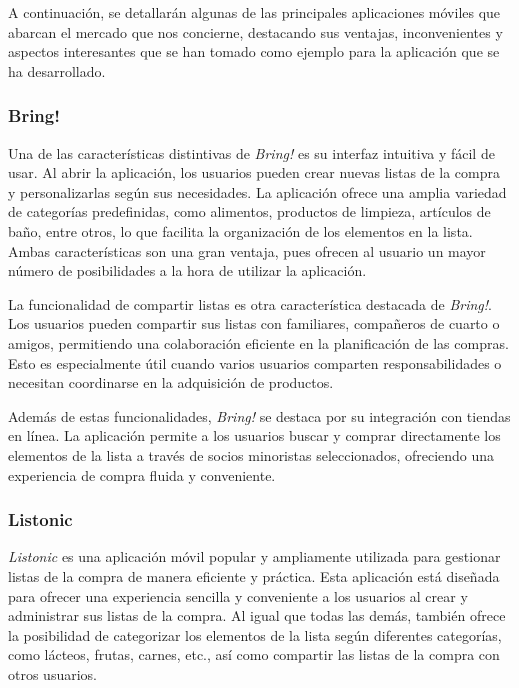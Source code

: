 \documentclass{article}
\begin{document}
A continuación, se detallarán algunas de las principales aplicaciones móviles que abarcan el mercado que nos concierne, destacando sus ventajas, inconvenientes y aspectos interesantes que se han tomado como ejemplo para la aplicación que se ha desarrollado.

\subsubsection{Bring!}

Una de las características distintivas de \textit{Bring!} es su interfaz intuitiva y fácil de usar. Al abrir la aplicación, los usuarios pueden crear nuevas listas de la compra y personalizarlas según sus necesidades. La aplicación ofrece una amplia variedad de categorías predefinidas, como alimentos, productos de limpieza, artículos de baño, entre otros, lo que facilita la organización de los elementos en la lista. Ambas características son una gran ventaja, pues ofrecen al usuario un mayor número de posibilidades a la hora de utilizar la aplicación.

La funcionalidad de compartir listas es otra característica destacada de \textit{Bring!}. Los usuarios pueden compartir sus listas con familiares, compañeros de cuarto o amigos, permitiendo una colaboración eficiente en la planificación de las compras. Esto es especialmente útil cuando varios usuarios comparten responsabilidades o necesitan coordinarse en la adquisición de productos.

Además de estas funcionalidades, \textit{Bring!} se destaca por su integración con tiendas en línea. La aplicación permite a los usuarios buscar y comprar directamente los elementos de la lista a través de socios minoristas seleccionados, ofreciendo una experiencia de compra fluida y conveniente.

\subsubsection{Listonic}

\textit{Listonic} es una aplicación móvil popular y ampliamente utilizada para gestionar listas de la compra de manera eficiente y práctica. Esta aplicación está diseñada para ofrecer una experiencia sencilla y conveniente a los usuarios al crear y administrar sus listas de la compra. Al igual que todas las demás, también ofrece la posibilidad de categorizar los elementos de la lista según diferentes categorías, como lácteos, frutas, carnes, etc., así como compartir las listas de la compra con otros usuarios.
\end{document}
